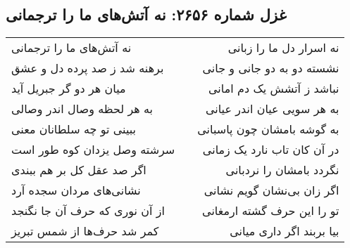 \begin{center}
\section*{غزل شماره ۲۶۵۶: نه آتش‌های ما را ترجمانی}
\label{sec:2656}
\begin{longtable}{l p{0.5cm} r}
نه آتش‌های ما را ترجمانی
&&
نه اسرار دل ما را زبانی
\\
برهنه شد ز صد پرده دل و عشق
&&
نشسته دو به دو جانی و جانی
\\
میان هر دو گر جبریل آید
&&
نباشد ز آتشش یک دم امانی
\\
به هر لحظه وصال اندر وصالی
&&
به هر سویی عیان اندر عیانی
\\
ببینی تو چه سلطانان معنی
&&
به گوشه بامشان چون پاسبانی
\\
سرشته وصل یزدان کوه طور است
&&
در آن کان تاب نارد یک زمانی
\\
اگر صد عقل کل بر هم ببندی
&&
نگردد بامشان را نردبانی
\\
نشانی‌های مردان سجده آرد
&&
اگر زان بی‌نشان گویم نشانی
\\
از آن نوری که حرف آن جا نگنجد
&&
تو را این حرف گشته ارمغانی
\\
کمر شد حرف‌ها از شمس تبریز
&&
بیا بربند اگر داری میانی
\\
\end{longtable}
\end{center}
